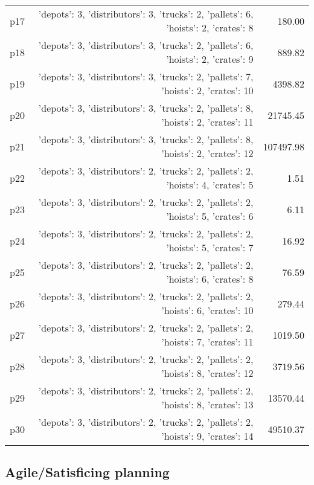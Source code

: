 \documentclass{article}
\begin{document}
\begin{center}
\begin{tabular}{@{}l|r|r@{}}
  p17&{'depots': 3, 'distributors': 3, 'trucks': 2, 'pallets': 6, 'hoists': 2, 'crates': 8}&180.00\\
  p18&{'depots': 3, 'distributors': 3, 'trucks': 2, 'pallets': 6, 'hoists': 2, 'crates': 9}&889.82\\
  p19&{'depots': 3, 'distributors': 3, 'trucks': 2, 'pallets': 7, 'hoists': 2, 'crates': 10}&4398.82\\
  p20&{'depots': 3, 'distributors': 3, 'trucks': 2, 'pallets': 8, 'hoists': 2, 'crates': 11}&21745.45\\
  p21&{'depots': 3, 'distributors': 3, 'trucks': 2, 'pallets': 8, 'hoists': 2, 'crates': 12}&107497.98\\
  p22&{'depots': 3, 'distributors': 2, 'trucks': 2, 'pallets': 2, 'hoists': 4, 'crates': 5}&1.51\\
  p23&{'depots': 3, 'distributors': 2, 'trucks': 2, 'pallets': 2, 'hoists': 5, 'crates': 6}&6.11\\
  p24&{'depots': 3, 'distributors': 2, 'trucks': 2, 'pallets': 2, 'hoists': 5, 'crates': 7}&16.92\\
  p25&{'depots': 3, 'distributors': 2, 'trucks': 2, 'pallets': 2, 'hoists': 6, 'crates': 8}&76.59\\
  p26&{'depots': 3, 'distributors': 2, 'trucks': 2, 'pallets': 2, 'hoists': 6, 'crates': 10}&279.44\\
  p27&{'depots': 3, 'distributors': 2, 'trucks': 2, 'pallets': 2, 'hoists': 7, 'crates': 11}&1019.50\\
  p28&{'depots': 3, 'distributors': 2, 'trucks': 2, 'pallets': 2, 'hoists': 8, 'crates': 12}&3719.56\\
  p29&{'depots': 3, 'distributors': 2, 'trucks': 2, 'pallets': 2, 'hoists': 8, 'crates': 13}&13570.44\\
  p30&{'depots': 3, 'distributors': 2, 'trucks': 2, 'pallets': 2, 'hoists': 9, 'crates': 14}&49510.37
                            \end{tabular}
                            \end{center}
                    

                                \subsection*{Agile/Satisficing planning}
                                
\end{document}
